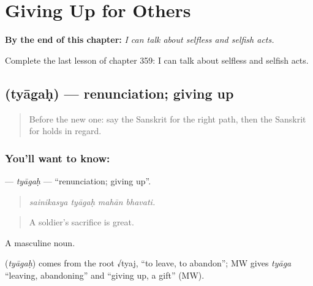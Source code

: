 
\chapter{Giving Up for Others}
\label{ch:sa-giving-up-for-others}

\begin{chapteropening}
\textbf{By the end of this chapter:} \emph{I can talk about selfless and selfish acts.}

Complete the last lesson of chapter 359: I can talk about selfless and selfish acts.
\end{chapteropening}

\section[\texorpdfstring{\sk{त्यागः} (tyāgaḥ)}{त्यागः (tyāgaḥ)}]{ (tyāgaḥ) — renunciation; giving up}

\label{lesson:SA-C359-tyagah}



\begin{quote}
Before the new one: say the Sanskrit for the right path, then the Sanskrit for holds in regard.
\end{quote}

\subsection*{You'll want to know: }
\textbf{} — \emph{tyāgaḥ} — \textquotedblleft{}renunciation; giving up\textquotedblright{}.

\begin{quote}
   
\end{quote}

\begin{quote}
\emph{sainikasya tyāgaḥ mahān bhavati.}
\end{quote}

\begin{quote}
A soldier's sacrifice is great.
\end{quote}

A masculine noun.

\begin{cousinweb}
\textbf{} (\emph{tyāgaḥ}) comes from the root √tyaj, \textquotedblleft{}to leave, to abandon\textquotedblright{}; MW gives \emph{tyāga} \textquotedblleft{}leaving, abandoning\textquotedblright{} and \textquotedblleft{}giving up, a gift\textquotedblright{} (MW).
\end{cousinweb}

